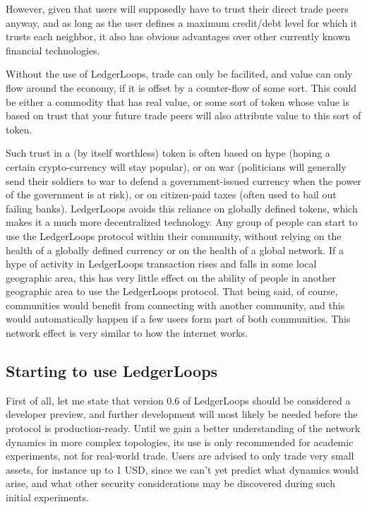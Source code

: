 \documentclass[11pt,twoside,a4paper]{article}
\begin{document}
However, given that users will supposedly have to trust their direct trade peers anyway, and as long as the user defines a maximum credit/debt level for which it trusts each neighbor, it also has obvious advantages over other currently known financial technologies.

Without the use of LedgerLoops, trade can only be facilited, and value can only flow around the economy, if it is offset by a counter-flow of some sort. This could be either a commodity that has real value, or some sort of token whose value is based on trust that your future trade peers will also attribute value to this sort of token.

Such trust in a (by itself worthless) token is often based on hype (hoping a certain crypto-currency will stay popular), or on war (politicians will generally send their soldiers to war to defend a government-issued currency when the power of the government is at risk), or on citizen-paid taxes (often used to bail out failing banks). LedgerLoops avoids this reliance on globally defined tokens, which makes it a much more decentralized technology. Any group of people can start to use the LedgerLoops protocol within their community, without relying on the health of a globally defined currency or on the health of a global network. If a hype of activity in LedgerLoops transaction rises and falls in some local geographic area, this has very little effect on the ability of people in another geographic area to use the LedgerLoops protocol. That being said, of course, communities would benefit from connecting with another community, and this would automatically happen if a few users form part of both communities. This network effect is very similar to how the internet works.

\subsection{Starting to use LedgerLoops}
First of all, let me state that version 0.6 of LedgerLoops should be considered a developer preview, and further development will most likely be needed before the protocol is production-ready. Until we gain a better understanding of the network dynamics in more complex topologies, its use is only recommended for academic experiments, not for real-world trade. Users are advised to only trade very small assets, for instance up to 1 USD, since we can't yet predict what dynamics would arise, and what other security considerations may be discovered during such initial experiments.
\end{document}

